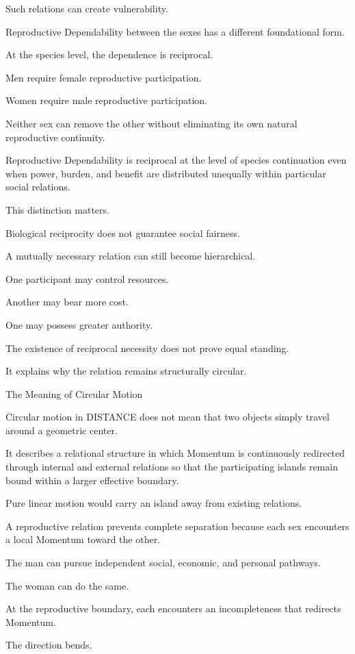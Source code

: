 Such relations can create vulnerability.

Reproductive Dependability between the sexes has a different foundational form.

At the species level, the dependence is reciprocal.

Men require female reproductive participation.

Women require male reproductive participation.

Neither sex can remove the other without eliminating its own natural reproductive continuity.

Reproductive Dependability is reciprocal at the level of species continuation even when power, burden, and benefit are distributed unequally within particular social relations.

This distinction matters.

Biological reciprocity does not guarantee social fairness.

A mutually necessary relation can still become hierarchical.

One participant may control resources.

Another may bear more cost.

One may possess greater authority.

The existence of reciprocal necessity does not prove equal standing.

It explains why the relation remains structurally circular.

The Meaning of Circular Motion

Circular motion in DISTANCE does not mean that two objects simply travel around a geometric center.

It describes a relational structure in which Momentum is continuously redirected through internal and external relations so that the participating islands remain bound within a larger effective boundary.

Pure linear motion would carry an island away from existing relations.

A reproductive relation prevents complete separation because each sex encounters a local Momentum toward the other.

The man can pursue independent social, economic, and personal pathways.

The woman can do the same.

At the reproductive boundary, each encounters an incompleteness that redirects Momentum.

The direction bends.

